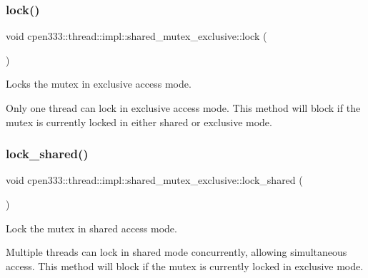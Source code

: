 \subsubsection{\texorpdfstring{lock()}{lock()}}
{\footnotesize\ttfamily void cpen333\+::thread\+::impl\+::shared\+\_\+mutex\+\_\+exclusive\+::lock (\begin{DoxyParamCaption}{ }\end{DoxyParamCaption})\hspace{0.3cm}{\ttfamily [inline]}}



Locks the mutex in exclusive access mode. 

Only one thread can lock in exclusive access mode. This method will block if the mutex is currently locked in either shared or exclusive mode. \mbox{\label{classcpen333_1_1thread_1_1impl_1_1shared__mutex__exclusive_ae934ab0e0518a0c0d4a220701f091073}} 
\subsubsection{\texorpdfstring{lock\+\_\+shared()}{lock\_shared()}}
{\footnotesize\ttfamily void cpen333\+::thread\+::impl\+::shared\+\_\+mutex\+\_\+exclusive\+::lock\+\_\+shared (\begin{DoxyParamCaption}{ }\end{DoxyParamCaption})\hspace{0.3cm}{\ttfamily [inline]}}



Lock the mutex in shared access mode. 

Multiple threads can lock in shared mode concurrently, allowing simultaneous access. This method will block if the mutex is currently locked in exclusive mode. \mbox{\label{classcpen333_1_1thread_1_1impl_1_1shared__mutex__exclusive_ae01b118cd23231f529f8666a3283380c}} 
